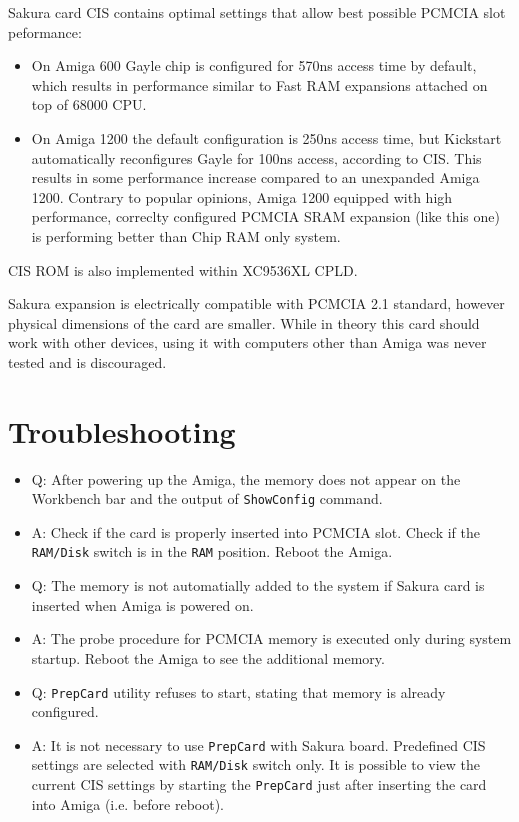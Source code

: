 \documentclass[10pt,a5paper]{article}
\begin{document}
Sakura card CIS contains optimal settings that allow best possible PCMCIA slot peformance:
\begin{itemize}
	\item On Amiga 600 Gayle chip is configured for 570ns access time by default, which results in performance similar to Fast RAM expansions attached on top of 68000 CPU.
	\item On Amiga 1200 the default configuration is 250ns access time, but Kickstart automatically reconfigures Gayle for 100ns access, according to CIS. This results in some performance increase compared to an unexpanded Amiga 1200. Contrary to popular opinions, Amiga 1200 equipped with high performance, correclty configured PCMCIA SRAM expansion (like this one) is performing better than Chip RAM only system.
\end{itemize}

CIS ROM is also implemented within XC9536XL CPLD.

Sakura expansion is electrically compatible with PCMCIA 2.1 standard, however physical dimensions of the card are smaller. While in theory this card should work with other devices, using it with computers other than Amiga was never tested and is discouraged.

\section*{Troubleshooting}

\begin{itemize}
	\item Q: After powering up the Amiga, the memory does not appear on the Workbench bar and the output of {\tt ShowConfig} command.
	\item A: Check if the card is properly inserted into PCMCIA slot. Check if the {\tt RAM/Disk} switch is in the {\tt RAM} position. Reboot the Amiga.
\end{itemize}

\begin{itemize}
	\item Q: The memory is not automatially added to the system if Sakura card is inserted when Amiga is powered on. 
	\item A: The probe procedure for PCMCIA memory is executed only during system startup. Reboot the Amiga to see the additional memory. 
\end{itemize}

\begin{itemize}
	\item Q: {\tt PrepCard} utility refuses to start, stating that memory is already configured. 
	\item A: It is not necessary to use {\tt PrepCard} with Sakura board. Predefined CIS settings are selected with {\tt RAM/Disk} switch only. It is possible to view the current CIS settings by starting the {\tt PrepCard} just after inserting the card into Amiga (i.e. before reboot). 
\end{itemize}
\end{document}
